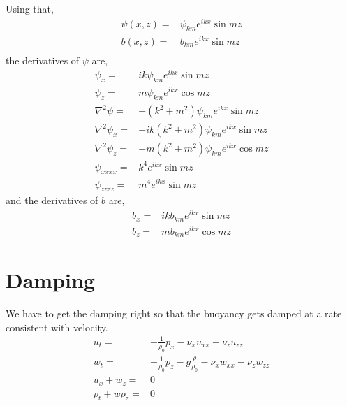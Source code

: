 \documentclass[11pt]{article}
\begin{document}
Using that,
\begin{align}
\psi(x,z) =& \psi_{km} e^{ikx} \sin mz \\
b(x,z) =& b_{km} e^{ikx} \sin mz \\
\end{align}
the derivatives of $\psi$ are,
\begin{align}
\psi_x =& ik\psi_{km} e^{ikx} \sin mz \\
\psi_z =& m \psi_{km} e^{ikx} \cos mz \\
\nabla^2 \psi =& -(k^2 + m^2) \psi_{km} e^{ikx} \sin mz \\
\nabla^2 \psi_x =& -i k (k^2 + m^2) \psi_{km} e^{ikx} \sin mz \\
\nabla^2 \psi_z =& -m (k^2 + m^2) \psi_{km} e^{ikx} \cos mz  \\
\psi_{xxxx} = & k^4 e^{ikx} \sin mz \\
\psi_{zzzz} = & m^4 e^{ikx} \sin mz
\end{align}
and the derivatives of $b$ are,
\begin{align}
b_x =& ik b_{km} e^{ikx} \sin mz \\
b_z =& m b_{km} e^{ikx} \cos mz
\end{align}

%
\section{Damping}
%

We have to get the damping right so that the buoyancy gets damped at a rate consistent with velocity.
\begin{subequations}{}
\begin{align}
\label{x-momentum-bq}
u_t =& - \frac{1}{\rho_0} p_x - \nu_x u_{xx} - \nu_z u_{zz} \\ \label {z-momentum-bq}
w_t =& - \frac{1}{\rho_0} p_z - g \frac{\rho}{\rho_0}  - \nu_x w_{xx} - \nu_z w_{zz} \\ \label{continuity-bq}
u_x + w_z =& 0 \\ \label{thermodynamic-bq}
\rho_t + w \bar{\rho}_z =& 0
\end{align}
\end{subequations}
\end{document}
